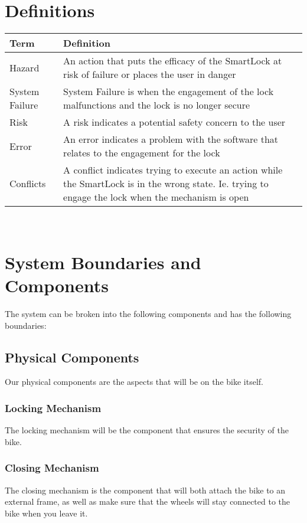 \documentclass{article}
\begin{document}
\section{Definitions}

\begin{minipage}{\textwidth}
\renewcommand*{\arraystretch}{1.5}
\begin{tabular}{| p{} | p{} |}
 \hline
 Term & Definition \\ 
 \hline
 Hazard & An action that puts the efficacy of the SmartLock at risk of failure or places the user in danger\\ 
  \hline
 System Failure & System Failure is when the engagement of the lock malfunctions and the lock is no longer secure\\ 
  \hline
 Risk & A risk indicates a potential safety concern to the user\\ 
  \hline
 Error & An error indicates a problem with the software that relates to the engagement for the lock\\ 
  \hline
 Conflicts & A conflict indicates trying to execute an action while the SmartLock is in the wrong state. Ie. trying to engage the lock when the mechanism is open\\ 
 \hline
\end{tabular}
\end{minipage}\\

\section{System Boundaries and Components}
The system can be broken into the following components and has the following boundaries:
\subsection {Physical Components}
Our physical components are the aspects that will be on the bike itself.
\subsubsection{Locking Mechanism}
The locking mechanism will be the component that ensures the security of the bike.
\subsubsection{Closing Mechanism}
The closing mechanism is the component that will both attach the bike to an external frame, as well as make sure that the wheels will stay connected to the bike when you leave it.
\end{document}
